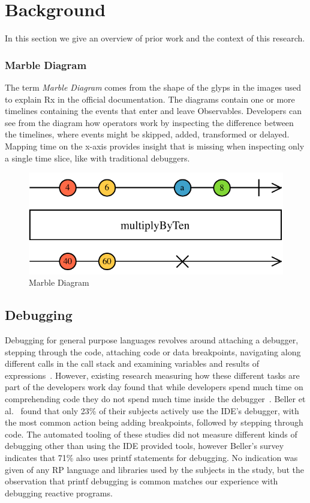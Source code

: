 \section{Background}
\label{background}
In this section we give an overview of prior work 
and the context of this research.



\subsubsection{Marble Diagram}
\label{marblediagram}
The term \textit{Marble Diagram} comes from the shape of the glyps in the images used to explain Rx in the official documentation. 
The diagrams contain one or more timelines containing the events that enter and leave Observables. 
Developers can see from the diagram how operators work by inspecting the difference between the timelines, 
where events might be skipped, added, transformed or delayed. 
Mapping time on the x-axis provides insight that is missing when inspecting only a single time slice, like with traditional debuggers.

\begin{figure}[ht]
\centering
\includegraphics[width=\columnwidth]{images/marble-diagram.pdf}
\caption{Marble Diagram}
\label{marblediagram-image}
\end{figure}

\subsection{Debugging}
Debugging for general purpose languages revolves around 
attaching a debugger,
stepping through the code, 
attaching code or data breakpoints, 
navigating along different calls in the call stack and 
examining variables and results of expressions~\cite{Spinellis2017}.
However, existing research measuring how these different tasks are part of the developers work day found that 
while developers spend much time on comprehending code they do not spend much time inside the debugger~\cite{minelli2015know}.
Beller et al.~\cite{beller2017behavior} found that only 23\% of their subjects actively use the IDE's debugger,
with the most common action being adding breakpoints, followed by stepping through code.
The automated tooling of these studies did not measure different kinds of debugging other than using the IDE provided tools, 
however Beller's survey indicates that 71\% also uses printf statements for debugging.
No indication was given of any RP language and libraries used by the subjects in the study, 
but the observation that printf debugging is common matches our experience with debugging reactive programs.

